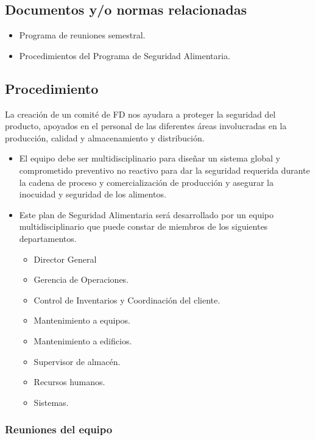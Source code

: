 \subsection{Documentos y/o normas relacionadas}

\begin{itemize}
	\item Programa de reuniones semestral.
	\item Procedimientos del Programa de Seguridad Alimentaria.
\end{itemize}

\subsection{Procedimiento}

La creación de un comité de \gls{FD} nos ayudara a proteger la seguridad del producto, apoyados en el personal de las diferentes áreas involucradas en la producción, calidad y almacenamiento y distribución.

\begin{itemize}
	\item El equipo debe ser multidisciplinario para diseñar un sistema global y comprometido preventivo no reactivo para dar la seguridad requerida durante la cadena de proceso y comercialización de producción y asegurar la inocuidad y seguridad de los alimentos.
	\item Este plan de Seguridad Alimentaria será desarrollado por un equipo multidisciplinario que puede constar de miembros de los siguientes departamentos.
	\begin{itemize}
		\item Director General
		\item Gerencia de Operaciones.
		\item Control de Inventarios y Coordinación del cliente.
		\item Mantenimiento a equipos.
		\item Mantenimiento a edificios.
		\item Supervisor de almacén.
		\item Recursos humanos.
		\item Sistemas.
	\end{itemize}
\end{itemize}

\subsubsection{Reuniones del equipo}

